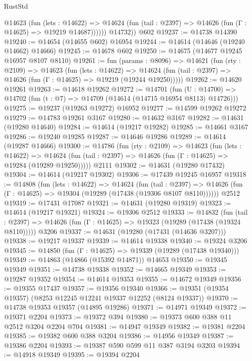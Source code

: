 \begin{lexlean}{RustStd}
\begin{coremodule}
            @14623
              (fun (lets : @14622) =>
              @14624 (fun (tail : @2397) => @14626 (fun (Γ : @14625) => @19219 @14687))))))
        @14732))
    @602
@19237 := @14738 @14390
@19240 := @14654 (@14655 @602) @16954
@19244 := @14614 (@14646 (@19240 @14662) @14666)
@19245 := @14678 @602
@19250 := @14675 (@14677 @19245 @16957 @8107 @8110)
@19261 := fun (params : @8096) =>
  @14621
    (fun (rty : @2109) =>
    @14623
      (fun (lets : @14622) =>
      @14624 (fun (tail : @2397) => @14626 (fun (Γ : @14625) => @19219 (@19244 @19250)))))
@19262 := @14620 @19261
@19263 := @14618 @19262
@19272 := @14701
    (fun (U : @14700) => @14702 (fun (t : @7) => @14709 (@14614 (@14715 @16954 @8113) @14726)))
@19275 := @19237 (@19263 @19272) @16952
@19277 := @14599 @19262 @19272
@19279 := @14783 @19261 @3167
@19280 := @14632 @3167
@19282 := @14631 (@19280 @14640)
@19284 := @14614 (@19217 @19282)
@19285 := @14661 @3167
@19286 := @19240 @19285
@19287 := @14646 @19286
@19289 := @14614 (@19287 @14666)
@19300 := @14786
    (fun (rty : @2109) =>
    @14623
      (fun (lets : @14622) =>
      @14624 (fun (tail : @2397) => @14626 (fun (Γ : @14625) => @19284 (@19289 @19250)))))
    @2111
@19302 := @14631 (@19280 @17432)
@19304 := @14614 (@19217 @19302)
@19306 := @17439 @19245 @16957
@19318 := @14808
    (fun (lets : @14622) =>
    @14624
      (fun (tail : @2397) =>
      @14626 (fun (Γ : @14625) => @19304 (@19289 (@17438 (@19306 @8107 @8110))))))
    @2512
@19319 := @17431 @17087
@19321 := @14631 (@19280 @19319)
@19323 := @14614 (@19217 @19321)
@19324 := @19306 @2512
@19333 := @14832
    (fun (tail : @2397) => @14626 (fun (Γ : @14625) => @19323 (@19289 (@17438 (@19324 @8110)))))
    @3206
@19337 := @14631 (@19280 (@17431 (@14636 @3207)))
@19338 := @19217 @19337
@19339 := @14614 @19338
@19340 := @19324 @3206
@19345 := @14850 (fun (Γ : @14625) => @19339 (@19289 (@17438 @19340)))
@19349 := @14863 (@14866 (@15392 @14871)) @14653
@19350 := @19345 @19349
@19351 := @14738 @19338
@19352 := @14665 @19349
@19353 := @19287 @19352
@19354 := @14614 @19353
@19355 := @14672 @19349
@19356 := @19355 @17437
@19357 := @19356 @19340
@19366 := @19351 (@19354 @19357) (@8253 @12245 @12241 @19337 @12252 (@8124 @19337))
@19370 := @14738 @19353 @19357 (@14895 @19286)
@19371 := @14971 @19349
@19372 := @19371 @2204
@19373 := @19372 @394
@19380 := @19373 @600 @388 @11 @2512 @3204 @2204 @704
@19381 := @14947 @19349
@19382 := @19381 @2204
@19385 := @19382 @600 @388 @3204
@19386 := @14956 @19349
@19387 := @19386 @2204
@19393 := @19387 @590 @599 @11 @387 @3194 @3203
@19394 := @14918 @19349
@19395 := @19394 @2204

\end{coremodule}
\end{lexlean}
